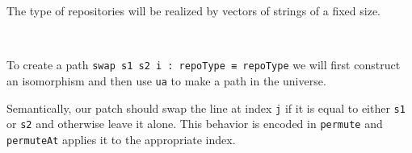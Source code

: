 The type of repositories will be realized by vectors of strings of a fixed size.
\begin{code}%
\>[0]\AgdaSpace{}%
\AgdaSymbol{:}\AgdaSpace{}%
\<%
\\
\>[0]\AgdaSpace{}%
\AgdaSymbol{=}\AgdaSpace{}%
\AgdaSpace{}%
\AgdaSpace{}%
\<%
\end{code}

To create a path \texttt{swap s1 s2 i : repoType ≡ repoType} we will first construct an
isomorphism and then use \texttt{ua} to make a path in the universe.

Semantically, our patch should swap the line at index \texttt{j} if it is equal to either \texttt{s1}
or \texttt{s2} and otherwise leave it alone. This behavior is encoded in \texttt{permute} and \texttt{permuteAt}
applies it to the appropriate index.

